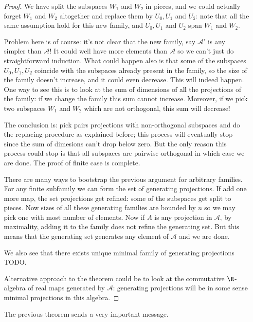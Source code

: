 \begin{proof}
	We have split the subspaces $W_{1}$ and $W_{2}$ in pieces, and we could actually forget $W_{1}$ and $W_{2}$ altogether and replace them by $U_{0}, U_{1}$ and $U_{2}$: note that all the same assumption hold for this new family, and $U_{0}, U_{1}$ and $U_{2}$ span $W_{1}$ and $W_{2}$.

	Problem here is of course: it's not clear that the new family, say $\mathcal{A}'$ is any simpler than $\mathcal{A}$! It could well have more elements than $\mathcal{A}$ so we can't just do straightforward induction. What could happen also is that some of the subspaces $U_{0}, U_{1}, U_{2}$ coincide with the subspaces already present in the family, so the size of the family doesn't increase, and it could even decrease. This will indeed happen. One way to see this is to look at the sum of dimensions of all the projections of the family: if we change the family this sum cannot increase. Moreover, if we pick two subspaces $W_{1}$ and $W_{2}$ which are not orthogonal, this sum will decrease!

	The conclusion is: pick pairs projections with non-orthogonal subspaces and do the replacing procedure as explained before; this process will eventually stop since the sum of dimesions can't drop below zero. But the only reason this process could stop is that all subspaces are pairwise orthogonal in which case we are done. The proof of finite case is complete.

	There are many ways to bootstrap the previous argument for arbitrary families. For any finite subfamily we can form the set of generating projections. If add one more map, the set projections get refined: some of the subspaces get split to pieces. Now sizes of all these generating families are bounded by $n$ so we may pick one with most number of elements. Now if $A$ is any projection in $\mathcal{A}$, by maximality, adding it to the family does not refine the generating set. But this means that the generating set generates any element of $\mathcal{A}$ and we are done.

	We also see that there exists unique minimal family of generating projections TODO.

	Alternative approach to the theorem could be to look at the commutative $\R$-algebra of real maps generated by $\mathcal{A}$: generating projections will be in some sense minimal projections in this algebra.
\end{proof}

The previous theorem sends a very important message.

